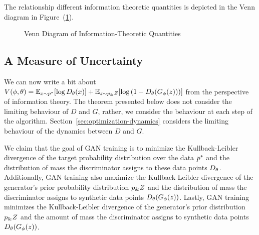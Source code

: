   The relationship different information theoretic quantities is depicted in the
  Venn diagram in Figure~(\ref{fig:venn-information}).

\begin{figure}[h!]
  \centering
  \caption{Venn Diagram of Information-Theoretic Quantities}%
  \label{fig:venn-information}
\end{figure}


\subsection{A Measure of Uncertainty}%
\label{sec:info-value-function}

We can now write a bit about
$V(\phi, \theta) = \mathbb{E}_{x \sim p^*}[{\log D_\theta(x})] + \mathbb{E}_{z \sim
  p_\&Z}[\log{(1 - D_\theta(G_\phi(z)))}]$ from the perspective of
information theory.  The theorem presented below does not consider the
limiting behaviour of $D$ and $G$, rather, we consider the behaviour at
each step of the algorithm.  Section~\ref{sec:optimization-dynamics}
considers the limiting behaviour of the dynamics between $D$ and $G$.

We claim that the goal of GAN training is to minimize the
Kullback-Leibler divergence of the target probability distribution
over the data $p^*$ and the distribution of mass the discriminator
assigns to these data points $D_\theta$.  Additionally, GAN training also
maximize the Kullback-Leibler divergence of the generator's prior
probability distribution $p_\&Z$ and the distribution of mass the
discriminator assigns to synthetic data points $D_\theta(G_\phi(z))$. Lastly,
GAN training minimizes the Kullback-Leibler divergence of the
generator's prior distribution $p_\&Z$ and the amount of mass the
discriminator assigns to synthetic data points $D_\theta(G_\phi(z))$.

